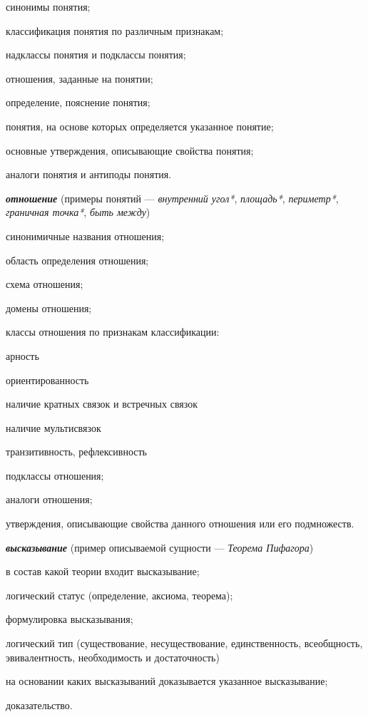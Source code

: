 \begin{textitemize}
	\item синонимы понятия;
	\item классификация понятия по различным признакам;
	\item надклассы понятия и подклассы понятия;
	\item отношения, заданные на понятии;
	\item определение, пояснение понятия;
	\item понятия, на основе которых определяется указанное понятие;
	\item основные утверждения, описывающие свойства понятия;
	\item аналоги понятия и антиподы понятия.
\end{textitemize}

\textbf{\textit{отношение}} (примеры понятий --- \textit{внутренний угол*}, \textit{площадь*}, \textit{периметр*}, \textit{граничная точка*}, \textit{быть между\scnrolesign})

\begin{textitemize}
	\item синонимичные названия отношения;
	\item область определения отношения;
	\item схема отношения;
	\item домены отношения;
	\item классы отношения по признакам классификации:
	\begin{textitemize}
		\item арность
		\item ориентированность
		\item наличие кратных связок и встречных связок
		\item наличие мультисвязок
		\item транзитивность, рефлексивность
	\end{textitemize}
	\item подклассы отношения;
	\item аналоги отношения;
	\item утверждения, описывающие свойства данного отношения или его подмножеств.
\end{textitemize}

\textbf{\textit{высказывание}} (пример описываемой сущности --- \textit{Теорема Пифагора})

\begin{textitemize}
	\item в состав какой теории входит высказывание;
	\item логический статус (определение, аксиома, теорема);
	\item формулировка высказывания;
	\item логический тип (существование, несуществование, единственность, всеобщность, эвивалентность, необходимость и достаточность)
	\item на основании каких высказываний доказывается указанное высказывание;
	\item доказательство.
\end{textitemize}

